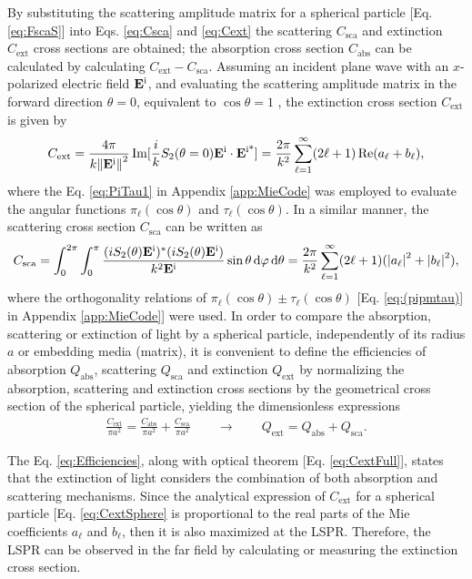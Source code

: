 By substituting the scattering amplitude matrix for a spherical particle [Eq. \eqref{eq:FscaS}]  into Eqs. \eqref{eq:Csca} and \eqref{eq:Cext}  the scattering $C_\text{sca}$ and extinction $C_\text{ext}$ cross sections are obtained; the absorption
cross section $C_\text{abs}$ can be calculated by calculating $C_\text{ext} - C_\text{sca}$. Assuming an incident plane wave with an $x$-polarized electric field $\vb{E}^\text{i}$, and evaluating the scattering amplitude matrix in the forward direction $\theta = 0$, equivalent to $\cos\theta = 1$ , the extinction cross section $C_\text{ext}$ is given by
%
\begin{align}
	C_\text{ext} = \frac{4\pi}{k \norm{\vb{E}^\text{i}}^2}\Im[\frac{i}{k}S_2(\theta = 0)\vb{E}^\text{i}\cdot\vb{E}^\text{i*}]
	  			 = \frac{2 \pi}{k^2}\sum_{\ell = 1}^\infty (2 \ell + 1) \Re(a_\ell + b_\ell),
	\label{eq:CextSphere}
\end{align}
where the Eq. \eqref{eq:PiTau1} in Appendix \ref{app:MieCode} was employed to evaluate the angular functions $\pi_\ell(\cos\theta)$ and $\tau_\ell(\cos\theta)$. In a similar manner, the scattering cross section $C_\text{sca}$  can be written as
%
\begin{align}
C_\text{sca} = \int_0^{2\pi}\int_0^\pi  \frac{(iS_2(\theta)\vb{E}^\text{i})^*(iS_2(\theta)\vb{E}^\text{i})}{k^2\vb{E}^\text{i}} \sin\theta\dd{\varphi}\dd{\theta}
			 = \frac{2 \pi}{k^2}\sum_{\ell = 1}^\infty (2 \ell + 1) (\abs{a_\ell}^2 + \abs{b_\ell}^2),
	\label{eq:CscaSphere}
\end{align}
%
where the orthogonality relations of $\pi_\ell(\cos\theta)\pm\tau_\ell(\cos\theta)$ [Eq. \eqref{eq:(pipmtau)} in Appendix \ref{app:MieCode}] were used. In order to compare the absorption, scattering or extinction of light by a spherical particle, independently of its radius $a$ or embedding media (matrix), it is convenient to define the efficiencies of  absorption $Q_\text{abs}$, scattering $Q_\text{sca}$ and extinction $Q_\text{ext}$  by normalizing the  absorption, scattering and extinction cross sections by the geometrical cross section of the spherical particle, yielding the dimensionless expressions
%
\begin{align}
 	\frac{C_\text{ext}}{\pi a^2} =   \frac{C_\text{abs}}{\pi a^2}  + \frac{C_\text{sca}}{\pi a^2}
 		\qquad \longrightarrow \qquad
	Q_\text{ext} =    Q_\text{abs}  +  Q_\text{sca}.
	\label{eq:Efficiencies}
\end{align}
%

The Eq. \eqref{eq:Efficiencies}, along with optical theorem [Eq. \eqref{eq:CextFull}], states that the extinction of light considers  the combination of both absorption and scattering mechanisms. Since the analytical expression of $C_\text{ext}$ for a spherical particle [Eq. \eqref{eq:CextSphere} is proportional to the real parts of the Mie coefficients $a_\ell$ and $b_\ell$, then it is also maximized at the LSPR. Therefore, the LSPR can be observed in the far field by calculating or measuring the extinction cross section.

